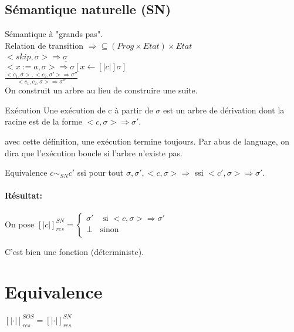 \documentclass[10pt,a4paper]{article}
\newcommand{\semm}[1]{\left[| #1 | \right]}
\begin{document}
 \subsection{Sémantique naturelle (SN)}
 
 Sémantique à "grands pas".\\
 Relation de transition $\Rightarrow \subseteq (Prog \times Etat) \times Etat$\\
$\overline{ <skip, \sigma > \Rightarrow \sigma }$\\
$\overline{  <x:=a , \sigma > \Rightarrow \sigma [ x \leftarrow \semm{c } \sigma ] }$\\
$\frac{ <c_1, \sigma > , <c_2 , \sigma' > \Rightarrow \sigma'' }{<c_1, c_2, \sigma > \Rightarrow \sigma''}$\\

On construit un arbre au lieu de construire une suite.
\begin{definition}{Exécution}
Une exécution de c à partir de $\sigma$ est un arbre de dérivation dont la racine est de la forme $<c, \sigma > \Rightarrow \sigma'$.\\
\end{definition} 
\begin{rem}{}
avec cette définition, une exécution termine toujours. Par abus de language, on dira que l'exécution boucle si l'arbre n'existe pas.
\end{rem}
\begin{definition}{Equivalence}
 $c \sim_{SN} c'$ ssi pour tout $\sigma, \sigma', < c, \sigma > \Rightarrow$ ssi $<c', \sigma > \Rightarrow \sigma'$.\\
\end{definition} 


\paragraph*{Résultat:}
On pose $\semm{c}_{res}^{SN} = \left\{ \begin{array}{ll}
 \sigma' &\text{ si } <c, \sigma > \Rightarrow \sigma' \\
 \perp & \text{sinon} \\
\end{array} \right.$

\begin{thm}{} C'est bien une fonction (déterministe).\\
\end{thm}

\section{Equivalence}
\begin{thm}{} $ \semm{ \cdot }_{res}^{SOS} = \semm{ \cdot }_{res}^{SN}$\\
\end{thm}
\end{document}
